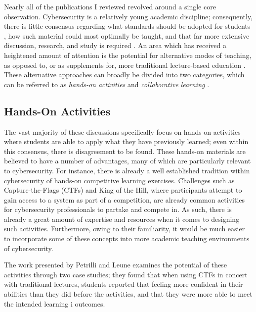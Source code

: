 \documentclass{article}
\begin{document}
    Nearly all of the publications I reviewed revolved around a single core observation. 
    Cybersecurity is a relatively young academic discipline; 
    consequently, there is little consensus regarding what standards should be adopted for students \cite{R-Raj}, how such material could most optimally be taught, and that far more extensive discussion, research, and study is required \cite{Z-Zeng}. 
    An area which has received a heightened amount of attention is the potential for alternative modes of teaching, as opposed to, or as supplements for, more traditional lecture-based education \cite{Z-Zeng,N-Eliot,E-Gavas,C-Herr,K-Chung, C-Kussmaul,K-Leune,B-Payne,L-Thomas}. 
    These alternative approaches can broadly be divided into two categories, which can be referred to as \emph{hands-on activities} and \emph{collaborative learning} \cite{P-Deshpande,C-Kussmaul,B-Payne}.

\subsection{Hands-On Activities}

    The vast majority of these discussions specifically focus on hands-on activities where students are able to apply what they have previously learned; even within this consensus, there is disagreement to be found. 
    These hands-on materials are believed to have a number of advantages, many of which are particularly relevant to cybersecurity. For instance, there is already a well established tradition within cybersecurity of hands-on competitive learning exercises. 
    Challenges such as Capture-the-Flags (CTFs) and King of the Hill, where participants attempt to gain access to a system as part of a competition, are already common activities for cybersecurity professionals to partake and compete in. 
    As such, there is already a great amount of expertise and resources when it comes to designing such activities. 
    Furthermore, owing to their familiarity, it would be much easier to incorporate some of these concepts into more academic teaching environments of cybersecurity.

    The work presented by Petrilli and Leune examines the potential of these activities through two case studies; 
    they found that when using CTFs in concert with traditional lectures, students reported that feeling more confident in their abilities than they did before the activities, and that they were more able to meet the intended learning i outcomes. 
\end{document}

